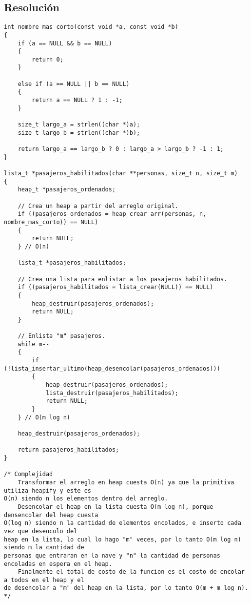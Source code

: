 \documentclass{article}
\begin{document}
\subsection*{Resolución}
\begin{lstlisting}[frame=single]
int nombre_mas_corto(const void *a, const void *b)
{
    if (a == NULL && b == NULL)
    {
        return 0;
    }

    else if (a == NULL || b == NULL)
    {
        return a == NULL ? 1 : -1;
    }

    size_t largo_a = strlen((char *)a);
    size_t largo_b = strlen((char *)b);

    return largo_a == largo_b ? 0 : largo_a > largo_b ? -1 : 1; 
}

lista_t *pasajeros_habilitados(char **personas, size_t n, size_t m)
{
    heap_t *pasajeros_ordenados;

    // Crea un heap a partir del arreglo original.
    if ((pasajeros_ordenados = heap_crear_arr(personas, n, nombre_mas_corto)) == NULL)
    {
        return NULL;
    } // O(n)

    lista_t *pasajeros_habilitados;

    // Crea una lista para enlistar a los pasajeros habilitados.
    if ((pasajeros_habilitados = lista_crear(NULL)) == NULL)
    {
        heap_destruir(pasajeros_ordenados);
        return NULL;
    }

    // Enlista "m" pasajeros.
    while m--
    {
        if (!lista_insertar_ultimo(heap_desencolar(pasajeros_ordenados)))
        {
            heap_destruir(pasajeros_ordenados);
            lista_destruir(pasajeros_habilitados);
            return NULL;
        }
    } // O(m log n) 

    heap_destruir(pasajeros_ordenados);

    return pasajeros_habilitados;
}

/* Complejidad
    Transformar el arreglo en heap cuesta O(n) ya que la primitiva utiliza heapify y este es 
O(n) siendo n los elementos dentro del arreglo.
    Desencolar el heap en la lista cuesta O(m log n), porque densencolar del heap cuesta 
O(log n) siendo n la cantidad de elementos encolados, e inserto cada vez que desencolo del 
heap en la lista, lo cual lo hago "m" veces, por lo tanto O(m log n) siendo m la cantidad de 
personas que entraran en la nave y "n" la cantidad de personas encoladas en espera en el heap.
    Finalmente el total de costo de la funcion es el costo de encolar a todos en el heap y el 
de desencolar a "m" del heap en la lista, por lo tanto O(m + m log n).
*/
\end{lstlisting}
\end{document}
